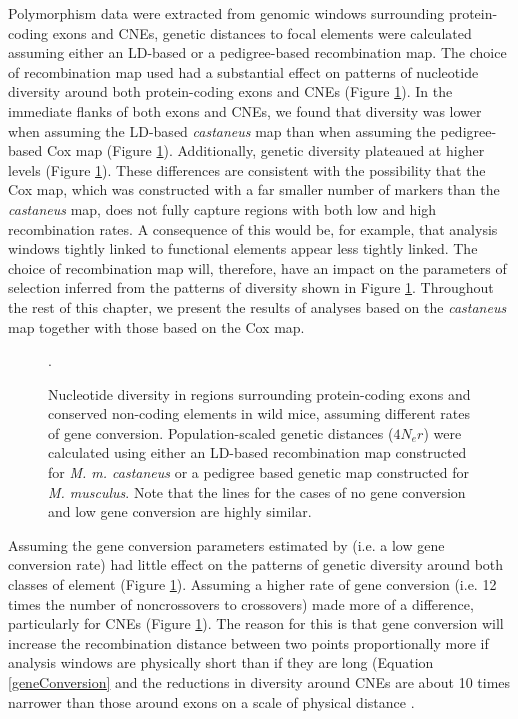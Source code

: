 	Polymorphism data were extracted from genomic windows surrounding protein-coding exons and CNEs, genetic distances to focal elements were calculated assuming either an LD-based or a pedigree-based recombination map. The choice of recombination map used had a substantial effect on patterns of nucleotide diversity around both protein-coding exons and CNEs (Figure \ref{fig:Diversity2x2}). In the immediate flanks of both exons and CNEs, we found that diversity was lower when assuming the LD-based \textit{castaneus} map than when assuming the pedigree-based Cox map (Figure \ref{fig:Diversity2x2}). Additionally, genetic diversity plateaued at higher levels (Figure \ref{fig:Diversity2x2}). These differences are consistent with the possibility that the Cox map, which was constructed with a far smaller number of markers than the \textit{castaneus} map, does not fully capture regions with both low and high recombination rates. A consequence of this would be, for example, that analysis windows tightly linked to functional elements appear less tightly linked. The choice of recombination map will, therefore, have an impact on the parameters of selection inferred from the patterns of diversity shown in Figure \ref{fig:Diversity2x2}. Throughout the rest of this chapter, we present the results of analyses based on the \textit{castaneus} map together with those based on the Cox map.

\linespread{1}
\begin{figure}[h!]
   \centering      
   \noindent{}
 \caption{Nucleotide diversity in regions surrounding protein-coding exons and conserved non-coding elements in wild mice, assuming different rates of gene conversion. Population-scaled genetic distances ($4N_er$) were calculated using either an LD-based recombination map constructed for \textit{M. m. castaneus} or a pedigree based genetic map constructed for \textit{M. musculus}. Note that the lines for the cases of no gene conversion and low gene conversion are highly similar.}.
 
 \label{fig:Diversity2x2}
\end{figure}
\linespread{2}

	 Assuming the gene conversion parameters estimated by \cite{RN263} (i.e. a low gene conversion rate) had little effect on the patterns of genetic diversity around both classes of element (Figure \ref{fig:Diversity2x2}). Assuming a higher rate of gene conversion (i.e. 12 times the number of noncrossovers to crossovers) made more of a difference, particularly for CNEs (Figure \ref{fig:Diversity2x2}). The reason for this is that gene conversion will increase the recombination distance between two points proportionally more if analysis windows are physically short than if they are long (Equation \ref{geneConversion} and the reductions in diversity around CNEs are about 10 times narrower than those around exons on a scale of physical distance \citep{RN122}. 
	 	 
